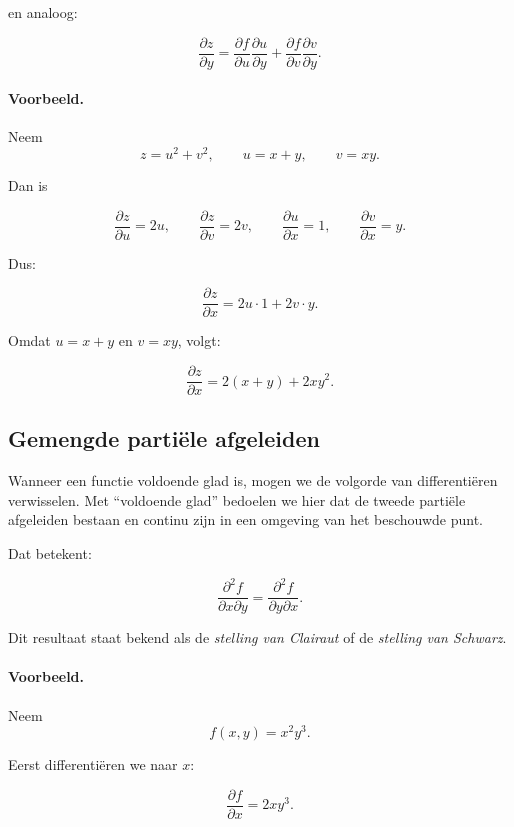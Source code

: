 \documentclass[11pt,a4paper]{article}
\begin{document}
    en analoog:

    \[
        \frac{\partial z}{\partial y}
        =
        \frac{\partial f}{\partial u}\frac{\partial u}{\partial y}
        +
        \frac{\partial f}{\partial v}\frac{\partial v}{\partial y}.
    \]

    \paragraph{Voorbeeld.}
    Neem
    \[
        z=u^2+v^2,
        \qquad
        u=x+y,
        \qquad
        v=xy.
    \]

    Dan is

    \[
        \frac{\partial z}{\partial u}=2u,
        \qquad
        \frac{\partial z}{\partial v}=2v,
        \qquad
        \frac{\partial u}{\partial x}=1,
        \qquad
        \frac{\partial v}{\partial x}=y.
    \]

    Dus:

    \[
        \frac{\partial z}{\partial x}
        =
        2u\cdot 1 + 2v\cdot y.
    \]

    Omdat $u=x+y$ en $v=xy$, volgt:

    \[
        \frac{\partial z}{\partial x}
        =
        2(x+y)+2xy^2.
    \]

    \subsection{Gemengde partiële afgeleiden}

    Wanneer een functie voldoende glad is, mogen we de volgorde van differentiëren verwisselen.
    Met ``voldoende glad'' bedoelen we hier dat de tweede partiële afgeleiden bestaan en continu zijn in een omgeving van het beschouwde punt.

    Dat betekent:

    \[
        \frac{\partial^2 f}{\partial x \partial y}
        =
        \frac{\partial^2 f}{\partial y \partial x}.
    \]

    Dit resultaat staat bekend als de \textit{stelling van Clairaut} of de
    \textit{stelling van Schwarz}.

    \paragraph{Voorbeeld.}
    Neem
    \[
        f(x,y)=x^2y^3.
    \]

    Eerst differentiëren we naar $x$:

    \[
        \frac{\partial f}{\partial x}=2xy^3.
    \]
\end{document}
